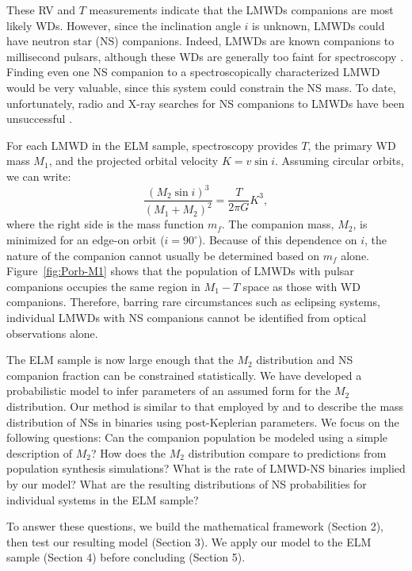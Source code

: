 \documentclass[apjl]{emulateapj}
\newcommand{\degree}{^{\circ}}
\newcommand{\period}{T}
\newcommand{\mf}{m_f}
\begin{document}
These RV and $\period$ measurements indicate that the LMWDs companions are most likely WDs. However, since the inclination angle $i$ is unknown, LMWDs could have neutron star (NS) companions. Indeed, LMWDs are known companions to millisecond pulsars, although these WDs are generally too faint for spectroscopy \citep{vKerkwijk96,callanan98,bassa06,antoniadis12}. Finding even one NS companion to a spectroscopically characterized LMWD would be very valuable, since this system could constrain the NS mass. To date, unfortunately, radio and X-ray searches for NS companions to LMWDs have been unsuccessful \citep{vLeeuwen07,agueros09b,agueros09a,kilic13}. 

For each LMWD in the ELM sample, spectroscopy provides $\period$, the primary WD mass $M_1$, and the projected orbital velocity $K=v \sin i$. Assuming circular orbits, we can write:
\begin{equation}
	\frac{(M_2 \sin i)^3}{\left(M_1+M_2\right)^2} = \frac{\period}{2\pi G} K^3, \label{eq:massfunc}
\end{equation}
where the right side is the mass function $\mf$. The companion mass, $M_2$, is minimized for an edge-on orbit ($i = 90\degree$). Because of this dependence on $i$, the nature of the companion cannot usually be determined based on $\mf$ alone. Figure~\ref{fig:Porb-M1} shows that the population of LMWDs with pulsar companions occupies the same region in $M_1 - \period$ space as those with WD companions. Therefore, barring rare circumstances such as eclipsing systems, individual LMWDs with NS companions cannot be identified from optical observations alone.

The ELM sample is now large enough that the $M_2$ distribution and NS companion fraction can be constrained statistically. %
We have developed a probabilistic model to infer parameters of an assumed form for the $M_2$ distribution. Our method is similar to that employed by \citet{ozel12} and \citet{kiziltan13} to describe the mass distribution of NSs in binaries using post-Keplerian parameters. We focus on the following questions: Can the companion population be modeled using a simple description of $M_2$? How does the $M_2$ distribution compare to predictions from population synthesis simulations?  What is the rate of LMWD-NS binaries implied by our model? What are the resulting distributions of NS probabilities for individual systems in the ELM sample? 

To answer these questions, we build the mathematical framework (Section 2), then test our resulting model (Section 3). We apply our model to the ELM sample (Section 4) before concluding (Section 5).
\end{document}
